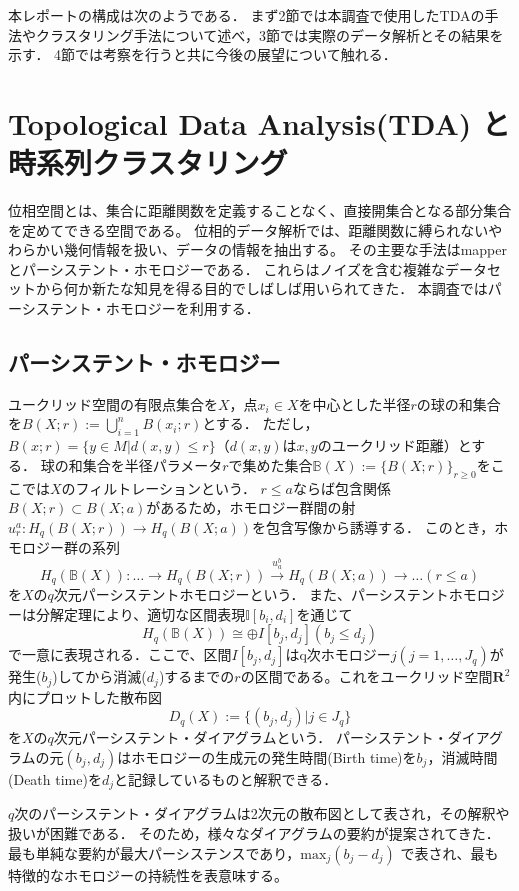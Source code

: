 \documentclass{jarticle}
\begin{document}
本レポートの構成は次のようである．
まず2節では本調査で使用したTDAの手法やクラスタリング手法について述べ，3節では実際のデータ解析とその結果を示す．
4節では考察を行うと共に今後の展望について触れる．

\section{Topological Data Analysis(TDA) と時系列クラスタリング}
位相空間とは、集合に距離関数を定義することなく、直接開集合となる部分集合を定めてできる空間である。
位相的データ解析では、距離関数に縛られないやわらかい幾何情報を扱い、データの情報を抽出する。
その主要な手法はmapper\cite{Singh2007}とパーシステント・ホモロジー\cite{Edelsbrunner2002}である．
これらはノイズを含む複雑なデータセットから何か新たな知見を得る目的でしばしば用いられてきた．
本調査ではパーシステント・ホモロジーを利用する．

\subsection{パーシステント・ホモロジー}
ユークリッド空間の有限点集合を$X$，点$x_i \in X$を中心とした半径$r$の球の和集合を$B(X;r):=\bigcup_{i=1}^n B(x_i;r)$とする．
ただし，$B(x;r) =\{y \in M | d(x,y) \leq r\}$（$d(x,y)$は$x,y$のユークリッド距離）とする．
球の和集合を半径パラメータ$r$で集めた集合$\mathbb B(X):=\{B(X;r)\}_{r\geq 0}$をここでは$X$のフィルトレーションという．
$r\leq a$ならば包含関係$B(X;r)\subset B(X;a)$があるため，ホモロジー群間の射$u_r^a : H_q(B(X;r))\rightarrow H_q(B(X;a)) $を包含写像から誘導する．
このとき，ホモロジー群の系列
$$
H_q(\mathbb B(X)):\dots\rightarrow H_q(B(X;r))\overset{u_a^b}{\rightarrow} H_q(B(X;a))\rightarrow\dots (r\leq a)
$$
を$X$の$q$次元パーシステントホモロジーという．
また、パーシステントホモロジーは分解定理\cite{Zomorodian2005}により、適切な区間表現$\mathbb I[b_i, d_i] $を通じて
$$
H_q(\mathbb B(X))\cong\oplus I[b_j,d_j] (b_j\leq d_j)
$$
で一意に表現される．ここで、区間$I[b_j,d_j]$はq次ホモロジー$j(j=1,\dots,J_q)$が発生($b_j$)してから消滅($d_j$)するまでの$r$の区間である。これをユークリッド空間$\mathbf R^2$内にプロットした散布図
$$
D_q(X):= \{(b_j,d_j) | j \in J_q\}
$$
を$X$の$q$次元パーシステント・ダイアグラムという．
パーシステント・ダイアグラムの元$(b_j, d_j)$はホモロジーの生成元の発生時間(Birth time)を$b_j$，消滅時間(Death time)を$d_j$と記録しているものと解釈できる．

$q$次のパーシステント・ダイアグラムは2次元の散布図として表され，その解釈や扱いが困難である．
そのため，様々なダイアグラムの要約が提案されてきた．
最も単純な要約が最大パーシステンスであり，$\text{max}_j(b_j - d_j)$
で表され、最も特徴的なホモロジーの持続性を表意味する。
\end{document}

